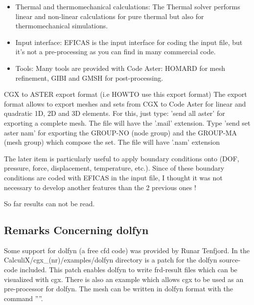 \documentclass{article}
\begin{document}
\begin{appendix}
\begin{itemize}
\item Thermal and thermomechanical calculations: 
The Thermal solver performs linear and non-linear calculations for pure thermal but also for thermomechanical simulations.

\item Input interface: 
EFICAS is the input interface for coding the input file, but it's not a pre-processing as you can find in many commercial code.

\item Tools: 
Many tools are provided with Code Aster: HOMARD for mesh refinement, GIBI and GMSH for post-processing.
\end{itemize}

CGX to ASTER export format (i.e HOWTO use this export format)
The export format allows to export meshes and sets from CGX to Code Aster for linear and quadratic 1D, 2D and 3D elements. For this, just type: 'send all aster' for exporting a complete mesh. The file will have the '.mail' extension.
Type 'send set aster nam' for exporting the GROUP-NO (node group) and the GROUP-MA (mesh group) which compose the set. The file will have '.nam' extension

The later item is particularly useful to apply boundary conditions onto (DOF, pressure, force, displacement, temperature, etc.). Since of these boundary conditions are coded with EFICAS in the input file, I thought it was not necessary to develop another features than the 2 previous ones !

So far results can not be read.

\subsection{\label{Remarks Concerning dolfyn}Remarks Concerning dolfyn}
Some support for dolfyn (a free cfd code) was provided by Runar Tenfjord.
In the CalculiX/cgx\_(nr)/examples/dolfyn directory is a patch for the dolfyn source-code included. This patch enables dolfyn to write frd-result files which can be visualized with cgx. There is also an example which allows cgx to be used as an pre-processor for dolfyn. The mesh can be written in dolfyn format with the command ''''.  


\end{appendix}
\end{document}
